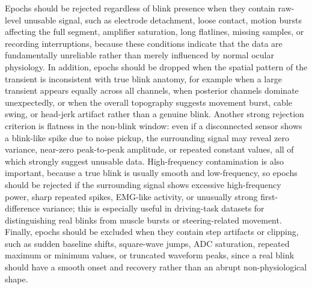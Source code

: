
Epochs should be rejected regardless of blink presence when they contain raw-level unusable signal, such as electrode detachment, loose contact, motion bursts affecting the full segment, amplifier saturation, long flatlines, missing samples, or recording interruptions, because these conditions indicate that the data are fundamentally unreliable rather than merely influenced by normal ocular physiology. In addition, epochs should be dropped when the spatial pattern of the transient is inconsistent with true blink anatomy, for example when a large transient appears equally across all channels, when posterior channels dominate unexpectedly, or when the overall topography suggests movement burst, cable swing, or head-jerk artifact rather than a genuine blink. Another strong rejection criterion is flatness in the non-blink window: even if a disconnected sensor shows a blink-like spike due to noise pickup, the surrounding signal may reveal zero variance, near-zero peak-to-peak amplitude, or repeated constant values, all of which strongly suggest unusable data. High-frequency contamination is also important, because a true blink is usually smooth and low-frequency, so epochs should be rejected if the surrounding signal shows excessive high-frequency power, sharp repeated spikes, EMG-like activity, or unusually strong first-difference variance; this is especially useful in driving-task datasets for distinguishing real blinks from muscle bursts or steering-related movement. Finally, epochs should be excluded when they contain step artifacts or clipping, such as sudden baseline shifts, square-wave jumps, ADC saturation, repeated maximum or minimum values, or truncated waveform peaks, since a real blink should have a smooth onset and recovery rather than an abrupt non-physiological shape.
